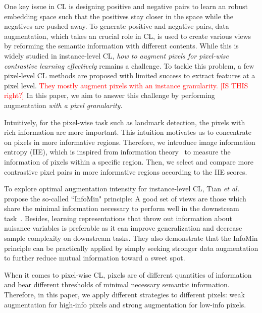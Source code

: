 \documentclass[10pt,twocolumn,letterpaper]{article}
\begin{document}
One key issue in CL is designing positive and negative pairs to learn an robust embedding space such that the positives stay closer in the space while the negatives are pushed away. 
To generate positive and negative pairs, data augmentation, which takes an crucial role in CL, is used to create various views by reforming the semantic information with different contents. 
While this is widely studied in instance-level CL, {\it how to augment pixels for pixel-wise contrastive learning effectively} remains a challenge. To tackle this problem, a few pixel-level CL methods \cite{} are proposed with limited success to extract features at a pixel level. \textcolor{red}{They mostly augment pixels with an instance granularity. [IS THIS right?]}
In this paper, we aim to answer this challenge by performing augmentation \textit{with a pixel granularity}.

Intuitively, for the pixel-wise task such as landmark detection, the pixels with rich information are more important. This intuition motivates us to concentrate on pixels in more informative regions.
Therefore, we introduce image information entropy (IIE), which is inspired from information theory~\cite{DBLP:journals/sigmobile/Shannon01} to measure the information of pixels within a specific region. Then, we select and compare more contrastive pixel pairs in more informative regions according to the IIE scores. 

To explore optimal augmentation intensity for instance-level CL, Tian {\it et al.}~\cite{tian2020makes} propose the so-called  ``InfoMin" principle: A good set of views are those which share the minimal information necessary to perform well in the downstream task~\cite{tian2020makes}. Besides, learning representations that throw out information about nuisance variables is preferable as it can improve generalization and decrease sample complexity on downstream tasks. They also demonstrate that the InfoMin principle can be practically applied by simply seeking stronger data augmentation to further reduce mutual information toward a sweet spot. 

When it comes to pixel-wise CL, pixels are of different quantities of information and bear different thresholds of minimal necessary semantic information. Therefore, in this paper, we apply different strategies to different pixels: weak augmentation for high-info pixels and strong augmentation for low-info pixels. 
\end{document}
